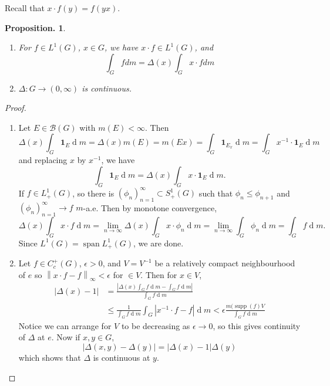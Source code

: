 \documentclass[11pt, a4paper]{memoir}
\newcommand{\norm}[1]{\ensuremath{\left\lVert#1\right\rVert}}
\theoremstyle{change}
\newtheorem{proposition}[theorem]{Proposition.}
\theoremstyle{plain}
\theoremstyle{nonumberplain}
\newtheorem{proof}{Proof}
\DeclareMathOperator{\spn}{span}
\DeclareMathOperator{\supp}{supp}
\renewcommand{\d}[1]{\ensuremath{\operatorname{d}\!{#1}}}
\newcommand{\idc}[1]{\ensuremath{\mathbf{1}_{#1}}}
\numberwithin{equation}{section}
\begin{document}
Recall that $x\cdot f(y)=f(yx)$.
\begin{proposition}
    \begin{enumerate}[nl,r]
        \item For $f\in L^1(G)$, $x\in G$, we have $x\cdot f\in L^1(G)$, and
            \begin{equation*}
                \int_G fdm=\Delta(x)\int_G x\cdot fdm
            \end{equation*}
        \item $\Delta:G\to(0,\infty)$ is continuous.
    \end{enumerate}
\end{proposition}
\begin{proof}
    \begin{enumerate}[nl,r]
        \item Let $E\in\mathcal{B}(G)$ with $m(E)<\infty$.
            Then
            \begin{equation*}
                \Delta(x)\int_G \idc{E}\d{m}=\Delta(x)m(E)=m(Ex)=\int_G \idc{E_x}\d{m}=\int_G x^{-1}\cdot \idc{E}\d{m}
            \end{equation*}
            and replacing $x$ by $x^{-1}$, we have
            \begin{equation*}
                \int_G\idc{E}\d{m}=\Delta(x)\int_Gx\cdot \idc{E}\d{m}.
            \end{equation*}
            If $f\in L^1_+(G)$, so there is $(\phi_n)_{n=1}^\infty\subset S^1_+(G)$ such that $\phi_n\leq\phi_{n+1}$ and $(\phi_n)_{n=1}^\infty\to f$ $m$-a.e.
            Then by monotone convergence,
            \begin{equation*}
                \Delta(x)\int_Gx\cdot f\d{m}=\lim_{n\to\infty}\Delta(x)\int_G x\cdot\phi_n\d{m}=\lim_{n\to\infty}\int_G\phi_n\d{m}=\int_G f\d{m}.
            \end{equation*}
            Since $L^1(G)=\spn L^1_+(G)$, we are done.
        \item Let $f\in C_c^+(G)$, $\epsilon>0$, and $V=V^{-1}$ be a relatively compact neighbourhood of $e$ so $\norm{x\cdot f-f}_\infty<\epsilon$ for $\in V$.
            Then for $x\in V$,
            \begin{align*}
                |\Delta(x)-1|&=\frac{|\Delta(x)\int_Gf\d{m}-\int_Gf\d{m}|}{\int_G f\d{m}}\\
                             &\leq\frac{1}{\int_G f\d{m}}\int_G|x^{-1}\cdot f-f|\d{m}<\epsilon\frac{m(\supp(f)V}{\int_Gf\d{m}}
            \end{align*}
            Notice we can arrange for $V$ to be decreasing as $\epsilon\to 0$, so this gives continuity of $\Delta$ at $e$.
            Now if $x,y\in G$,
            \begin{equation*}
                |\Delta(x,y)-\Delta(y)|=|\Delta(x)-1|\Delta(y)
            \end{equation*}
            which shows that $\Delta$ is continuous at $y$.
    \end{enumerate}
\end{proof}
\end{document}
